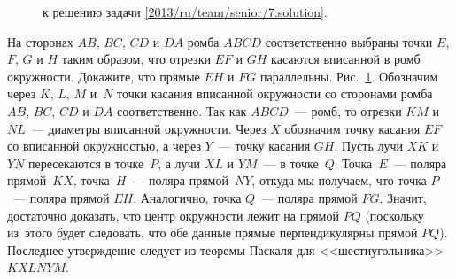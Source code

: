 \ifsolution
\begin{figure}\centering
    \caption{к решению задачи \ref{2013/ru/team/senior/7:solution}.}
    \label{2013/ru/team/senior/7:solution:fig}
\end{figure}%
\fi %

\problem{}
На сторонах $AB$, $BC$, $CD$ и $DA$ ромба $ABCD$ соответственно выбраны точки
$E$, $F$, $G$ и $H$ таким образом, что отрезки $EF$ и $GH$ касаются вписанной в
ромб окружности.
Докажите, что прямые $EH$ и $FG$ параллельны.
\solution
\label{2013/ru/team/senior/7:solution}%
Рис.~\ref{2013/ru/team/senior/7:solution:fig}.
Обозначим через $K$, $L$, $M$ и~$N$ точки касания вписанной окружности
со сторонами ромба $AB$, $BC$, $CD$ и $DA$ соответственно.
Так как $ABCD$~--- ромб, то отрезки $KM$ и $NL$~--- диаметры вписанной
окружности.
Через $X$ обозначим точку касания $EF$ со вписанной окружностью, а через
$Y$~--- точку касания $GH$.
Пусть лучи $XK$ и $YN$ пересекаются в точке~$P$, а лучи $XL$ и $YM$~---
в точке~$Q$.
Точка~$E$~--- поляра прямой~$KX$, точка~$H$~--- поляра прямой~$NY$, откуда мы
получаем, что точка $P$~--- поляра прямой $EH$.
Аналогично, точка $Q$~--- поляра прямой $FG$.
Значит, достаточно доказать, что центр окружности лежит на прямой $PQ$
(поскольку из~этого будет следовать, что обе данные прямые перпендикулярны
прямой $PQ$).
Последнее утверждение следует из теоремы Паскаля для <<шестиугольника>>
$KXLNYM$.
\endproblem

